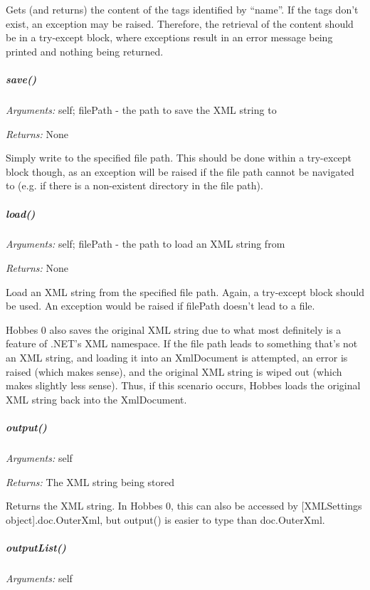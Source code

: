 \documentclass[12pt,letterpaper]{article}
\begin{document}
Gets (and returns) the content of the tags identified by ``name''. If the tags don't exist, an exception may be raised. Therefore, the retrieval of the content should be in a try-except block, where exceptions result in an error message being printed and nothing being returned.



%
%
\subparagraph{save()}
\label{4.4.1.0.3}

\emph{Arguments:} self; filePath - the path to save the XML string to

\emph{Returns:} None

Simply write to the specified file path. This should be done within a try-except block though, as an exception will be raised if the file path cannot be navigated to (e.g. if there is a non-existent directory in the file path).



%
%
\subparagraph{load()}
\label{4.4.1.0.4}

\emph{Arguments:} self; filePath - the path to load an XML string from

\emph{Returns:} None

Load an XML string from the specified file path. Again, a try-except block should be used. An exception would be raised if filePath doesn't lead to a file.

Hobbes 0 also saves the original XML string due to what most definitely is a feature of .NET's XML namespace. If the file path leads to something that's not an XML string, and loading it into an XmlDocument is attempted, an error is raised (which makes sense), and the original XML string is wiped out (which makes slightly less sense). Thus, if this scenario occurs, Hobbes loads the original XML string back into the XmlDocument.



%
%
\subparagraph{output()}
\label{4.4.1.0.5}

\emph{Arguments:} self

\emph{Returns:} The XML string being stored

Returns the XML string. In Hobbes 0, this can also be accessed by [XMLSettings object].doc.OuterXml, but output() is easier to type than doc.OuterXml.



%
%
\subparagraph{outputList()}
\label{4.4.1.0.6}

\emph{Arguments:} self
\end{document}
